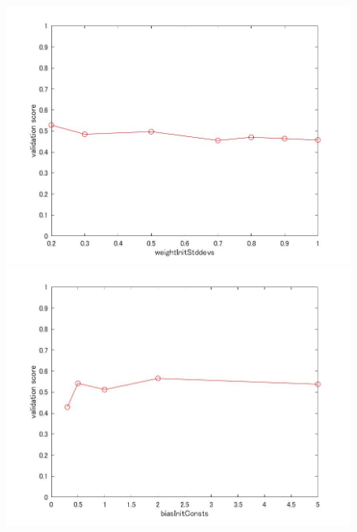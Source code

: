 \documentclass[a4j,11pt]{jarticle}
\begin{document}
\begin{figure}
\begin{minipage}{0.50\hsize}
\begin{center}
			\includegraphics[width=12cm, bb=0 0 875 656]{../matlab/fig/weightInitStddevs.jpg}
		\end{center}
	\end{minipage}
	\begin{minipage}{0.50\hsize}
		\begin{center}
			\includegraphics[width=12cm, bb=0 0 875 656]{../matlab/fig/biasInitConsts.jpg}
		\end{center}
	\end{minipage}
\end{figure}
\end{document}
